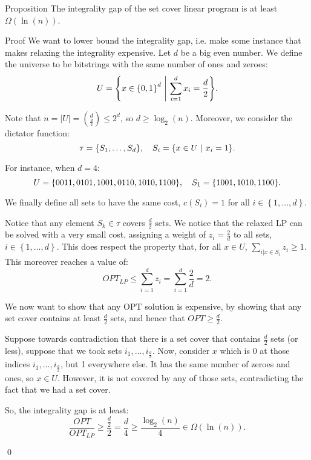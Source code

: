 \documentclass[a4paper]{article}
\begin{document}
\begin{parag}{Proposition}
    The integrality gap of the set cover linear program is at least $\Omega\left(\ln\left(n\right)\right)$.

    \begin{subparag}{Proof}
        We want to lower bound the integrality gap, i.e. make some instance that makes relaxing the integrality expensive. Let $d$ be a big even number. We define the universe to be bitstrings with the same number of ones and zeroes: 
        \[U = \left\{x \in \left\{0, 1\right\}^d \suchthat \sum_{i=1}^{d} x_i = \frac{d}{2}\right\}.\]

        Note that $n = \left|U\right| = \binom{d}{\frac{d}{2}} \leq 2^d$, so $d \geq \log_2\left(n\right)$. Moreover, we consider the dictator function: 
        \[\tau = \left\{S_1, \ldots, S_d\right\}, \mathspace S_i = \left\{x \in U \suchthat x_i = 1\right\}.\]

        For instance, when $d = 4$: 
        \[U = \left\{0011, 0101, 1001, 0110, 1010, 1100\right\}, \mathspace S_1 = \left\{1001, 1010, 1100\right\}.\]

        We finally define all sets to have the same cost, $c\left(S_i\right) = 1$ for all $i \in \left\{1, \ldots, d\right\}$.

        Notice that any element $S_k \in \tau$ covers $\frac{d}{2}$ sets. We notice that the relaxed LP can be solved with a very small cost, assigning a weight of $z_i = \frac{2}{d}$ to all sets, $i \in \left\{1, \ldots, d\right\}$. This does respect the property that, for all $x \in U$, $\sum_{i | x \in S_i} z_i \geq 1$. This moreover reaches a value of:
        \[OPT_{LP} \leq \sum_{i=1}^{d} z_i = \sum_{i=1}^{d} \frac{2}{d} = 2.\]

        We now want to show that any OPT solution is expensive, by showing that any set cover contains at least $\frac{d}{2}$ sets, and hence that $OPT \geq \frac{d}{2}$.

        Suppose towards contradiction that there is a set cover that contains $\frac{d}{2}$ sets (or less), suppose that we took sets $i_1, \ldots, i_{\frac{d}{2}}$. Now, consider $x$ which is 0 at those indices $i_1, \ldots, i_{\frac{d}{2}}$, but 1 everywhere else. It has the same number of zeroes and ones, so $x \in U$. However, it is not covered by any of those sets, contradicting the fact that we had a set cover. 

        So, the integrality gap is at least: 
        \[\frac{OPT}{OPT_{LP}} \geq \frac{\frac{d}{2}}{2} = \frac{d}{4} \geq \frac{\log_2\left(n\right)}{4} \in \Omega\left(\ln\left(n\right)\right).\]

        \qed
    \end{subparag}
\end{parag}
\end{document}
